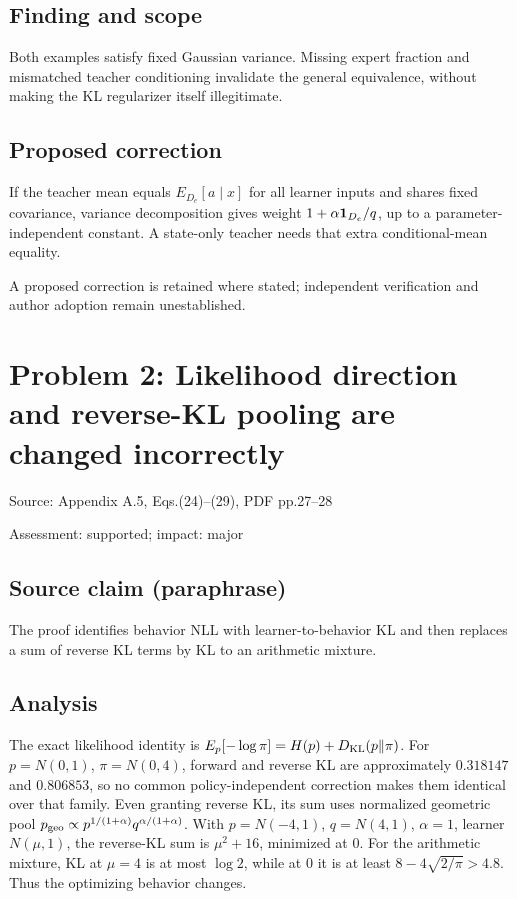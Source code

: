 \documentclass[11pt]{article}
\begin{document}
\subsection*{Finding and scope}

Both examples satisfy fixed Gaussian variance. Missing expert fraction and mismatched teacher conditioning invalidate the general equivalence, without making the KL regularizer itself illegitimate.

\subsection*{Proposed correction}

If the teacher mean equals \(E_{D_e}[a\mid x]\) for all learner inputs and shares fixed covariance, variance decomposition gives weight \(1+\alpha{\bf1}_{D_e}/q\), up to a parameter-independent constant. A state-only teacher needs that extra conditional-mean equality.

A proposed correction is retained where stated; independent verification and author adoption remain unestablished.

\section*{Problem 2: Likelihood direction and reverse-KL pooling are changed incorrectly}

Source: Appendix A.5, Eqs.(24)–(29), PDF pp.27–28

Assessment: supported; impact: major

\subsection*{Source claim (paraphrase)}

The proof identifies behavior NLL with learner-to-behavior KL and then replaces a sum of reverse KL terms by KL to an arithmetic mixture.

\subsection*{Analysis}

The exact likelihood identity is \(E_p[-\log\pi]=H(p)+D_{\rm KL}(p\Vert\pi)\). For \(p=N(0,1)\), \(\pi=N(0,4)\), forward and reverse KL are approximately \(0.318147\) and \(0.806853\), so no common policy-independent correction makes them identical over that family. Even granting reverse KL, its sum uses normalized geometric pool \(p_{\rm geo}\propto p^{1/(1+\alpha)}q^{\alpha/(1+\alpha)}\). With \(p=N(-4,1)\), \(q=N(4,1)\), \(\alpha=1\), learner \(N(\mu,1)\), the reverse-KL sum is \(\mu^2+16\), minimized at \(0\). For the arithmetic mixture, KL at \(\mu=4\) is at most \(\log2\), while at \(0\) it is at least \(8-4\sqrt{2/\pi}>4.8\). Thus the optimizing behavior changes.
\end{document}

